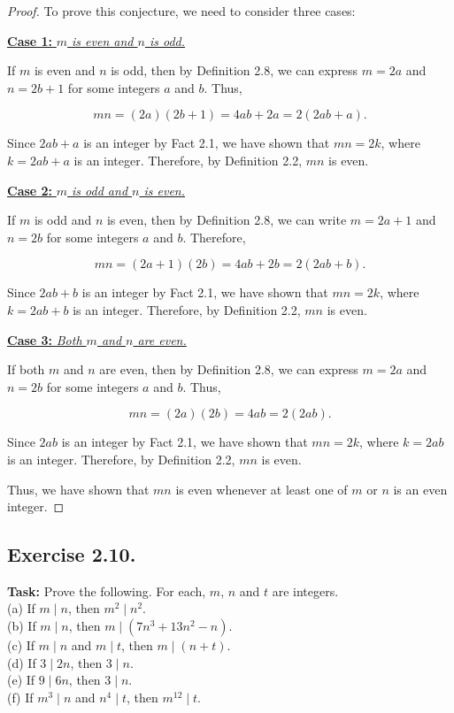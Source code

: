 \documentclass{article}
\begin{document}
\begin{proof}
    To prove this conjecture, we need to consider three cases:
    
    \noindent \underline{\textbf{Case 1:} \textit{\(m\) is even and \(n\) is odd.}}
    
    If \(m\) is even and \(n\) is odd, then by Definition 2.8, we can express \(m = 2a\) and \(n = 2b + 1\) for some integers \(a\) and \(b\). Thus,
    
    \[
    mn = (2a)(2b + 1) = 4ab + 2a = 2(2ab + a).
    \]
    
    Since \(2ab + a\) is an integer by Fact 2.1, we have shown that \(mn = 2k\), where \(k = 2ab + a\) is an integer. Therefore, by Definition 2.2, \(mn\) is even.
    
    \noindent \underline{\textbf{Case 2:} \textit{\(m\) is odd and \(n\) is even.}}
    
    If \(m\) is odd and \(n\) is even, then by Definition 2.8, we can write \(m = 2a + 1\) and \(n = 2b\) for some integers \(a\) and \(b\). Therefore,
    
    \[
    mn = (2a + 1)(2b) = 4ab + 2b = 2(2ab + b).
    \]
    
    Since \(2ab + b\) is an integer by Fact 2.1, we have shown that \(mn = 2k\), where \(k = 2ab + b\) is an integer. Therefore, by Definition 2.2, \(mn\) is even.
    
    \noindent \underline{\textbf{Case 3:} \textit{Both \(m\) and \(n\) are even.}}
    
    If both \(m\) and \(n\) are even, then by Definition 2.8, we can express \(m = 2a\) and \(n = 2b\) for some integers \(a\) and \(b\). Thus,
    
    \[
    mn = (2a)(2b) = 4ab = 2(2ab).
    \]
    
    Since \(2ab\) is an integer by Fact 2.1, we have shown that \(mn = 2k\), where \(k = 2ab\) is an integer. Therefore, by Definition 2.2, \(mn\) is even.
    
    Thus, we have shown that \(mn\) is even whenever at least one of \(m\) or \(n\) is an even integer.
\end{proof}

\newpage

\subsection{Exercise 2.10.}
\textbf{Task:} Prove the following. For each, $m$, $n$ and $t$ are integers.\\
(a) If $m \mid n$, then $m^2 \mid n^2$.\\
(b) If $m \mid n$, then $m \mid (7n^3+13n^2-n)$.\\
(c) If $m \mid n$ and $m \mid t$, then $m \mid (n+t)$.\\
(d) If $3 \mid 2n$, then $3 \mid n$.\\
(e) If $9 \mid 6n$, then $3 \mid n$.\\
(f) If $m^3 \mid n$ and $n^4 \mid t$, then $m^{12} \mid t$.\\
\end{document}
